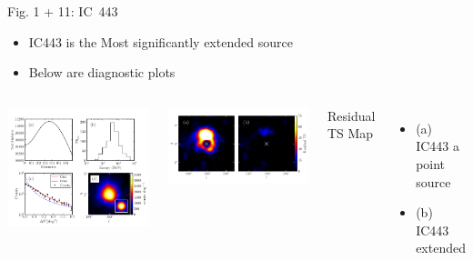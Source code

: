 \documentclass[12pt]{beamer}
\begin{document}
\begin{frame}{Fig. 1 + 11: IC~443}
\begin{itemize}
\item IC443 is the Most significantly extended source
\item Below are diagnostic plots
\end{itemize}
  \begin{columns}
      \includegraphics[scale=0.35]{plots/four_plots_ic443_color.pdf}

      \includegraphics[scale=0.35]{plots/res_tsmap_ic443_color.pdf}

      Residual TS Map 
      \begin{itemize}
      \item (a) IC443 a point source 
      \item (b) IC443 extended
      \end{itemize}
  \end{columns}
\end{frame}
\end{document}
